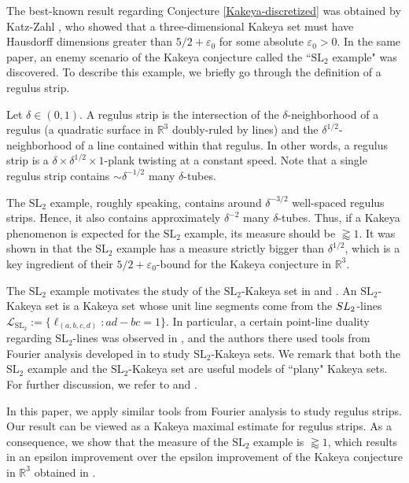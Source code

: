 \documentclass{amsart}%
\numberwithin{equation}{section}
\newcommand{\de}{\delta}
\newcommand{\e}{\varepsilon}
\newcommand{\cl}{\mathcal L}
\newcommand{\ZR}{\mathbb{R}}
\newcommand{\SL}{{\rm{SL}}}
\newcommand{\1}{\mathbbm{1}}
\begin{document}
\smallskip

The best-known result regarding Conjecture \ref{Kakeya-discretized} was obtained by Katz-Zahl \cite{Katz-Zahl-1}, who showed that a three-dimensional Kakeya set must have Hausdorff dimensions greater than $5/2+\e_0$ for some absolute $\e_0>0$.
In the same paper, an enemy scenario of the Kakeya conjecture called the ``$\text{SL}_2$ example" was discovered.
To describe this example, we briefly go through the definition of a regulus strip.

Let $\de\in(0,1)$. 
A regulus strip is the intersection of the $\de$-neighborhood of a regulus (a quadratic surface in $\ZR^3$ doubly-ruled by lines) and the $\de^{1/2}$-neighborhood of a line contained within that regulus.
In other words, a regulus strip is a $\de\times\de^{1/2}\times1$-plank twisting at a constant speed.
Note that a single regulus strip contains $\sim\de^{-1/2}$ many $\de$-tubes.



The $\text{SL}_2$ example, roughly speaking, contains around $\de^{-3/2}$ well-spaced regulus strips. 
Hence, it also contains approximately $\de^{-2}$ many $\de$-tubes.
Thus, if a Kakeya phenomenon is expected for the $\text{SL}_2$ example, its measure should be $\gtrapprox1$.
It was shown in \cite{Katz-Zahl-1} that the $\text{SL}_2$ example has a measure strictly bigger than $\de^{1/2}$, which is a key ingredient of their $5/2+\e_0$-bound for the Kakeya conjecture in $\ZR^3$.


\smallskip



The $\text{SL}_2$ example motivates the study of the $\text{SL}_2$-Kakeya set in \cite{FO} and \cite{KWZ}.
An $\text{SL}_2$-Kakeya set is a Kakeya set whose unit line segments come from the $\SL_2$-lines $\cl_{\text{SL}_2}:=\{\ell_{(a,b,c,d)}: ad-bc=1\}$. 
In particular, a certain point-line duality regarding $\text{SL}_2$-lines was observed in \cite{FO}, and the authors there used tools from Fourier analysis developed in \cite{GGGHMW} to study $\text{SL}_2$-Kakeya sets.
We remark that both the $\text{SL}_2$ example and the $\text{SL}_2$-Kakeya set are useful models of ``plany" Kakeya sets.
For further discussion, we refer to \cite{Katz-Zahl-1} and \cite{KWZ}.

\smallskip

In this paper, we apply similar tools from Fourier analysis to study regulus strips.
Our result can be viewed as a Kakeya maximal estimate for regulus strips.
As a consequence, we show that the measure of the $\text{SL}_2$ example is $\gtrapprox1$, which results in an epsilon improvement over the epsilon improvement of the Kakeya conjecture in $\ZR^3$ obtained in \cite{Katz-Zahl-1}.
\end{document}
